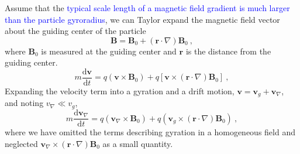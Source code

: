 \documentclass[12pt,a4paper]{article}
\renewcommand{\vec}[1]{\boldsymbol{#1}}
\newcommand{\dif}{\mathrm{d}}
\begin{document}
Assume that the \textcolor{blue}{typical scale length of a magnetic field gradient is much larger than the particle gyroradius}, we can Taylor expand the magnetic field vector about the guiding center of the particle
\begin{equation}
\vec{B} = \vec{B}_0 +(\vec{r}\cdot \nabla) \vec{B}_0 ~,
\end{equation}
where $\vec{B}_0$ is measured at the guiding center and $\vec{r}$ is the distance from the guiding center. 
\begin{equation}
m \dfrac{\dif \vec{v}}{\dif t} = q(\vec{v} \times \vec{B}_0) +q[\vec{v} \times (\vec{r}\cdot \nabla) \vec{B}_0] ~,
\end{equation}
Expanding the velocity term into a gyration and a drift motion, $\vec{v} = \vec{v}_g +\vec{v}_\nabla$, and noting $v_\nabla \ll v_g$, 
\begin{equation}
m \dfrac{\dif \vec{v}_\nabla}{\dif t} = q(\vec{v}_\nabla \times \vec{B}_0) +q(\vec{v}_g \times (\vec{r} \cdot \nabla)\vec{B}_0) ~,
\end{equation}
where we have omitted the terms describing gyration in a homogeneous field and neglected $\vec{v}_\nabla \times  (\vec{r}\cdot \nabla) \vec{B}_0$ as a small quantity.
\end{document}
